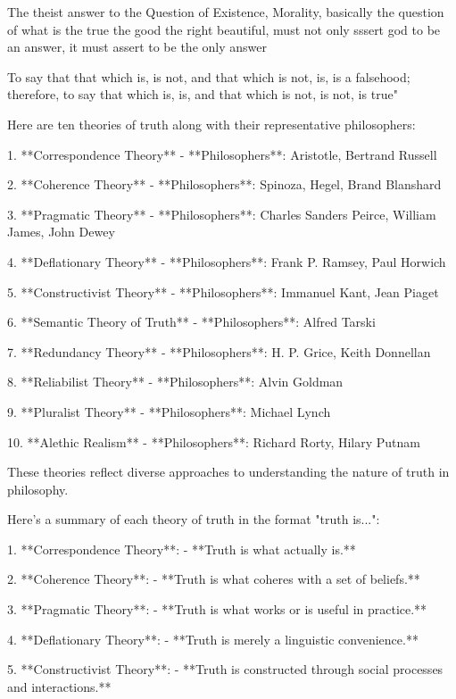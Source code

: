 The theist answer to the Question of Existence, Morality, basically the question of what is the true the good the right beautiful, must not only sssert god to be an answer, it must assert to be the only answer 



To say that that which is, is not, and that which is not, is, is a falsehood; therefore, to say that which is, is, and that which is not, is not, is true"


Here are ten theories of truth along with their representative philosophers:

1. **Correspondence Theory**  
   - **Philosophers**: Aristotle, Bertrand Russell

2. **Coherence Theory**  
   - **Philosophers**: Spinoza, Hegel, Brand Blanshard

3. **Pragmatic Theory**  
   - **Philosophers**: Charles Sanders Peirce, William James, John Dewey

4. **Deflationary Theory**  
   - **Philosophers**: Frank P. Ramsey, Paul Horwich

5. **Constructivist Theory**  
   - **Philosophers**: Immanuel Kant, Jean Piaget

6. **Semantic Theory of Truth**  
   - **Philosophers**: Alfred Tarski

7. **Redundancy Theory**  
   - **Philosophers**: H. P. Grice, Keith Donnellan

8. **Reliabilist Theory**  
   - **Philosophers**: Alvin Goldman

9. **Pluralist Theory**  
   - **Philosophers**: Michael Lynch

10. **Alethic Realism**  
    - **Philosophers**: Richard Rorty, Hilary Putnam

These theories reflect diverse approaches to understanding the nature of truth in philosophy.


Here’s a summary of each theory of truth in the format "truth is...":

1. **Correspondence Theory**:  
   - **Truth is what actually is.**

2. **Coherence Theory**:  
   - **Truth is what coheres with a set of beliefs.**

3. **Pragmatic Theory**:  
   - **Truth is what works or is useful in practice.**

4. **Deflationary Theory**:  
   - **Truth is merely a linguistic convenience.**

5. **Constructivist Theory**:  
   - **Truth is constructed through social processes and interactions.**

